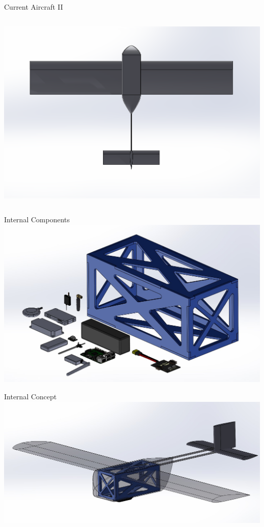 \documentclass{beamer}
\newcommand{\setpresentername}[1]{\renewcommand{\presentername}{#1}}
\newcommand{\setpresentertitle}[1]{\renewcommand{\presentertitle}{#1}}
\newcommand{\presentername}{}
\newcommand{\presentertitle}{}
\begin{document}
\begin{frame}{Current Aircraft II}
\begin{columns}[T]
            \begin{column}{0.5\textwidth}
                \centering
                \includegraphics[width=\textwidth]{figures/current/Current Top.png}
            \end{column}
        \end{columns}
    \end{frame}

    \setpresentername{Patricia Ovono}
    \setpresentertitle{Flight Performance Engineer}
    \begin{frame}{Internal Components}
        \centering
        \includegraphics[width=\textwidth]{figures/box internals/InternalsAndBox.jpg}    
    \end{frame}

    \begin{frame}{Internal Concept}
        \centering
        \includegraphics[width=\textwidth]{figures/box internals/BoxInFuselage.jpg}
    \end{frame}
\end{document}
